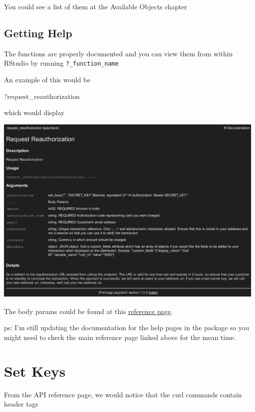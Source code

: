 \documentclass[]{book}
\newenvironment{Shaded}{\begin{snugshade}}{\end{snugshade}}
\newcommand{\NormalTok}[1]{#1}
\begin{document}
You could see a list of them at the Available Objects chapter

\section{Getting Help}\label{getting-help}

The functions are properly documented and you can view them from within
RStudio by running \texttt{?\_function\_name}

An example of this would be

\begin{Shaded}
\begin{Highlighting}[]
\NormalTok{?request_reauthorization}
\end{Highlighting}
\end{Shaded}

which would display

\includegraphics[width=33.11in]{img/help-page}

The body params could be found at this
\href{https://developers.paystack.co/v1.0/reference\#paystack-inline-x}{reference
page}.

ps: I'm still updating the documentation for the help pages in the
package so you might need to check the main reference page linked above
for the mean time.

\chapter{Set Keys}\label{set-keys}

From the API reference page, we would notice that the curl commands
contain header tags
\end{document}
